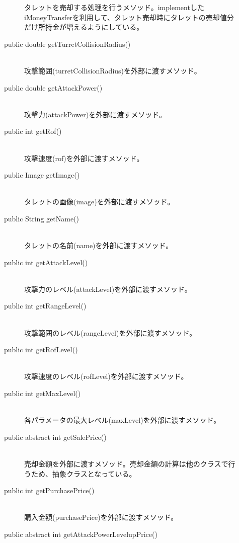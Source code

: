 \documentclass[11pt,a4j]{jarticle}
\begin{document}
\begin{description}
\begin{description}
                    タレットを売却する処理を行うメソッド。implementしたiMoneyTransferを利用して、タレット売却時にタレットの売却値分だけ所持金が増えるようにしている。
              \item[public double getTurretCollisionRadius()]\mbox{}\\
                    攻撃範囲(turretCollisionRadius)を外部に渡すメソッド。
              \item[public double getAttackPower()]\mbox{}\\
                    攻撃力(attackPower)を外部に渡すメソッド。
              \item[public int getRof()] \mbox{}\\
                    攻撃速度(rof)を外部に渡すメソッド。
              \item[public Image getImage()] \mbox{}\\
                    タレットの画像(image)を外部に渡すメソッド。
              \item[public String getName()] \mbox{}\\
                    タレットの名前(name)を外部に渡すメソッド。
              \item[public int getAttackLevel()] \mbox{}\\
                    攻撃力のレベル(attackLevel)を外部に渡すメソッド。
              \item[public int getRangeLevel()] \mbox{}\\
                    攻撃範囲のレベル(rangeLevel)を外部に渡すメソッド。
              \item[public int getRofLevel()]\mbox{}\\
                    攻撃速度のレベル(rofLevel)を外部に渡すメソッド。
              \item[public int getMaxLevel()]\mbox{}\\
                    各パラメータの最大レベル(maxLevel)を外部に渡すメソッド。
              \item[public abstract int getSalePrice()]\mbox{}\\
                    売却金額を外部に渡すメソッド。売却金額の計算は他のクラスで行うため、抽象クラスとなっている。
              \item[public int getPurchasePrice()]\mbox{}\\
                    購入金額(purchasePrice)を外部に渡すメソッド。
              \item[public abstract int getAttackPowerLevelupPrice()]\mbox{}\\

\end{description}
\end{description}
\end{document}
